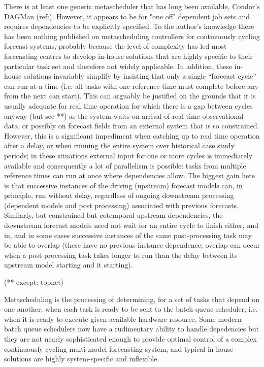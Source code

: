 \documentclass[11pt,a4paper]{article}
\begin{document}
There is at least one generic metascheduler that has long been
available, Condor's DAGMan (ref:). However, it appears to be for "one
off" dependent job sets and requires dependencies to be explicitly
specified.  To the author's knowledge there has been nothing published
on metascheduling controllers for continuously cycling forecast systems,
probably because the level of complexity has led most forecasting
centres to develop in-house solutions that are highly specific to their
particular task set and therefore not widely applicable. In addition,
these in-house solutions invariably simplify by insisting that only a
single ``forecast cycle'' can run at a time (i.e. all tasks with one
reference time must complete before any from the next can start). This
can arguably be justified on the grounds that it is usually adequate for
real time operation for which there is a gap between cycles anyway (but
see **) as the system waits on arrival of real time observational data,
or possibly on forecast fields from an external system that is so
constrained. However, this is a significant impediment when catching up
to real time operation after a delay, or when running the entire system
over historical case study periods; in these situations external input
for one or more cycles is immediately available and consequently a lot
of parallelism is possible: tasks from multiple reference times can run
at once where dependencies allow. The biggest gain here is that
successive instances of the driving (upstream) forecast models can, in
principle, run without delay, regardless of ongoing downstream
processing (dependent models and post processing) associated with
previous forecasts. Similarly, but constrained but cotemporal upstream
dependencies, the downstream forecast models need not wait for an entire
cycle to finish either, and in, and in some cases successive instances
of the same post-processing task may be able to overlap (these have no
previous-instance dependence; overlap can occur when a post processing
task takes longer to run than the delay between its upstream model
starting and it starting).

(** except: topnet)

Metascheduling is the processing of determining, for a set of tasks that
depend on one another, when each task is ready to be sent to the batch
queue scheduler; i.e. when it is ready to execute given available
hardware resource. Some modern batch queue schedulers now have a
rudimentary ability to handle depedencies but they are not nearly
sophisticated enough to provide optimal control of a complex
continuously cycling multi-model forecasting system, and typical
in-house solutions are highly system-specific and inflexible. 
\end{document}
